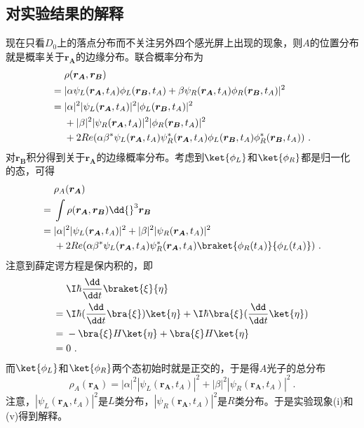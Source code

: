 \subsection{对实验结果的解释}
现在只看$D_0$上的落点分布而不关注另外四个感光屏上出现的现象，则$A$的位置分布就是概率关于$\boldsymbol{r_A}$的边缘分布。联合概率分布为
\begin{align}\label{eq_DCQ_8}
&\rho(\boldsymbol{r_A},\boldsymbol{r_B}) \notag \\
={}&|\alpha\psi_L(\boldsymbol{r_A},t_A)\phi_L(\boldsymbol{r_B},t_A)+\beta\psi_R(\boldsymbol{r_A},t_A)\phi_R(\boldsymbol{r_B},t_A)|^2 \notag \\
={}&|\alpha|^2|\psi_L(\boldsymbol{r_A},t_A)|^2|\phi_L(\boldsymbol{r_B},t_A)|^2 \notag \\
&+|\beta|^2|\psi_R(\boldsymbol{r_A},t_A)|^2|\phi_R(\boldsymbol{r_B},t_A)|^2 \notag \\
&+2Re(\alpha\beta^*\psi_L(\boldsymbol{r_A},t_A)\psi_R^*(\boldsymbol{r_A},t_A)\phi_L(\boldsymbol{r_B},t_A)\phi_R^*(\boldsymbol{r_B},t_A))~.
\end{align}
对$\boldsymbol{r_B}$积分得到关于$\boldsymbol{r_A}$的边缘概率分布。考虑到$\ket{\phi_L}$和$\ket{\phi_R}$都是归一化的态，可得
\begin{align}
&\rho_A(\boldsymbol{r_A}) \notag \\
={}&\int \rho(\boldsymbol{r_A},\boldsymbol{r_B})\dd{}^3\boldsymbol{r_B} \notag \\
={}&|\alpha|^2|\psi_L(\boldsymbol{r_A},t_A)|^2+|\beta|^2|\psi_R(\boldsymbol{r_A},t_A)|^2 \notag \\
&+2Re(\alpha\beta^*\psi_L(\boldsymbol{r_A},t_A)\psi_R^*(\boldsymbol{r_A},t_A)\braket{\phi_R(t_A)}{\phi_L(t_A)})~.
\end{align}
注意到薛定谔方程是保内积的，即
\begin{align}
&\I\hbar\frac{\dd}{\dd t}\braket{\xi}{\eta} \notag \\
={}&\I\hbar(\frac{\dd}{\dd t}\bra{\xi})\ket{\eta}+\I\hbar\bra{\xi}(\frac{\dd}{\dd t}\ket{\eta}) \notag \\
={}&-\bra{\xi}H\ket{\eta}+\bra{\xi}H\ket{\eta} \notag \\
={}&0~.
\end{align}
而$\ket{\phi_L}$和$\ket{\phi_R}$两个态初始时就是正交的，于是得$A$光子的总分布
\begin{equation}\label{eq_DCQ_9}
\rho_A(\boldsymbol{r_A})=|\alpha|^2|\psi_L(\boldsymbol{r_A},t_A)|^2+|\beta|^2|\psi_R(\boldsymbol{r_A},t_A)|^2~.
\end{equation}
注意，$|\psi_L(\boldsymbol{r_A},t_A)|^2$是$L$类分布，$|\psi_R(\boldsymbol{r_A},t_A)|^2$是$R$类分布。于是实验现象(i)和(v)得到解释。

